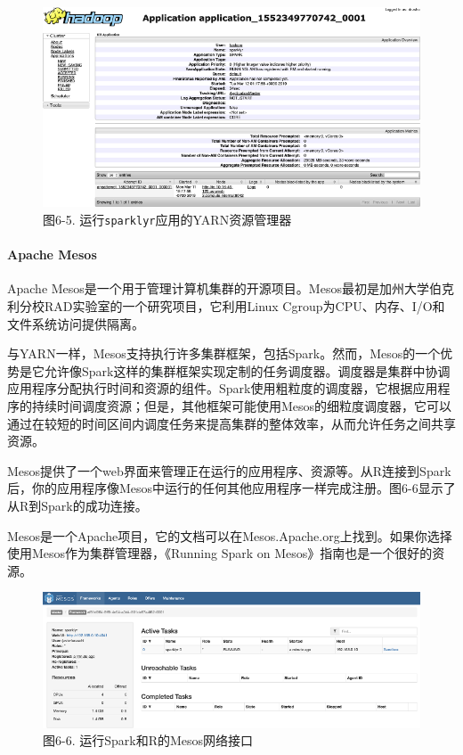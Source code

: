 \documentclass[
]{article}
\begin{document}
\begin{figure}
\centering
\includegraphics{figures/6_5.png}
\caption{图6-5. 运行\texttt{sparklyr}应用的YARN资源管理器}
\end{figure}

\hypertarget{apache-mesos}{%
\paragraph{Apache Mesos}\label{apache-mesos}}

Apache
Mesos是一个用于管理计算机集群的开源项目。Mesos最初是加州大学伯克利分校RAD实验室的一个研究项目，它利用Linux
Cgroup为CPU、内存、I/O和文件系统访问提供隔离。

与YARN一样，Mesos支持执行许多集群框架，包括Spark。然而，Mesos的一个优势是它允许像Spark这样的集群框架实现定制的任务调度器。调度器是集群中协调应用程序分配执行时间和资源的组件。Spark使用粗粒度的调度器，它根据应用程序的持续时间调度资源；但是，其他框架可能使用Mesos的细粒度调度器，它可以通过在较短的时间区间内调度任务来提高集群的整体效率，从而允许任务之间共享资源。

Mesos提供了一个web界面来管理正在运行的应用程序、资源等。从R连接到Spark后，你的应用程序像Mesos中运行的任何其他应用程序一样完成注册。图6-6显示了从R到Spark的成功连接。

Mesos是一个Apache项目，它的文档可以在Mesos.Apache.org上找到。如果你选择使用Mesos作为集群管理器，《Running
Spark on Mesos》指南也是一个很好的资源。

\begin{figure}
\centering
\includegraphics{figures/6_6.png}
\caption{图6-6. 运行Spark和R的Mesos网络接口}
\end{figure}
\end{document}
